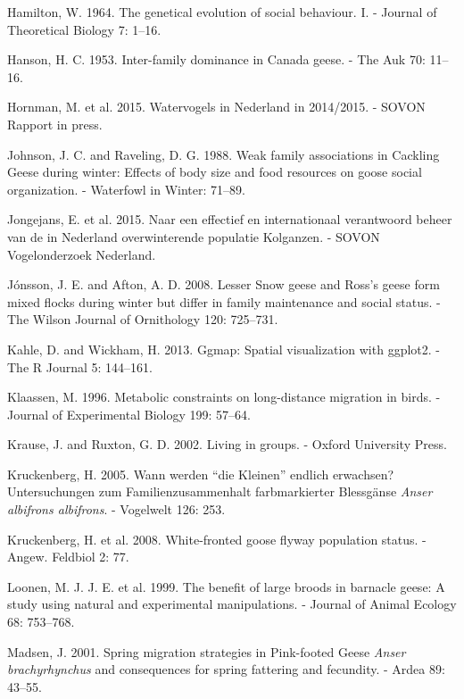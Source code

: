 \documentclass[10pt,twocolumn]{paper}
\begin{document}
\hypertarget{ref-HAMILTON19641}{}
Hamilton, W. 1964. The genetical evolution of social behaviour. I. -
Journal of Theoretical Biology 7: 1--16.

\hypertarget{ref-hanson1953dominance}{}
Hanson, H. C. 1953. Inter-family dominance in Canada geese. - The Auk
70: 11--16.

\hypertarget{ref-sovon2015watervogels}{}
Hornman, M. et al. 2015. Watervogels in Nederland in 2014/2015. - SOVON
Rapport in press.

\hypertarget{ref-johnson1988weak}{}
Johnson, J. C. and Raveling, D. G. 1988. Weak family associations in
Cackling Geese during winter: Effects of body size and food resources on
goose social organization. - Waterfowl in Winter: 71--89.

\hypertarget{ref-jongejans2015naar}{}
Jongejans, E. et al. 2015. Naar een effectief en internationaal
verantwoord beheer van de in Nederland overwinterende populatie
Kolganzen. - SOVON Vogelonderzoek Nederland.

\hypertarget{ref-jonsson2008lesser}{}
Jónsson, J. E. and Afton, A. D. 2008. Lesser Snow geese and Ross's geese
form mixed flocks during winter but differ in family maintenance and
social status. - The Wilson Journal of Ornithology 120: 725--731.

\hypertarget{ref-ggmap}{}
Kahle, D. and Wickham, H. 2013. Ggmap: Spatial visualization with
ggplot2. - The R Journal 5: 144--161.

\hypertarget{ref-Klaassen57}{}
Klaassen, M. 1996. Metabolic constraints on long-distance migration in
birds. - Journal of Experimental Biology 199: 57--64.

\hypertarget{ref-krause2002living}{}
Krause, J. and Ruxton, G. D. 2002. Living in groups. - Oxford University
Press.

\hypertarget{ref-kruckenberg2005young}{}
Kruckenberg, H. 2005. Wann werden ``die Kleinen'' endlich erwachsen?
Untersuchungen zum Familienzusammenhalt farbmarkierter Blessgänse
\emph{Anser albifrons albifrons}. - Vogelwelt 126: 253.

\hypertarget{ref-kruckenberg2008white}{}
Kruckenberg, H. et al. 2008. White-fronted goose flyway population
status. - Angew. Feldbiol 2: 77.

\hypertarget{ref-JANE:JANE325}{}
Loonen, M. J. J. E. et al. 1999. The benefit of large broods in barnacle
geese: A study using natural and experimental manipulations. - Journal
of Animal Ecology 68: 753--768.

\hypertarget{ref-madsen2001spring}{}
Madsen, J. 2001. Spring migration strategies in Pink-footed Geese
\emph{Anser brachyrhynchus} and consequences for spring fattering and
fecundity. - Ardea 89: 43--55.
\end{document}

